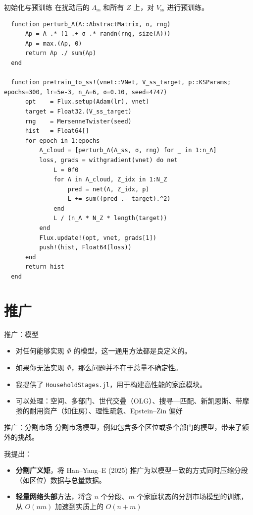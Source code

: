 \documentclass[10pt,aspectratio=169]{beamer}
\begin{document}
\begin{frame}[fragile]{初始化与预训练}
  在扰动后的 $\Lambda_{\mathrm{ss}}$ 和所有 $Z$ 上，对 $V_{\mathrm{ss}}$ 进行预训练。
  \begin{lstlisting}
  function perturb_Λ(Λ::AbstractMatrix, σ, rng)
      Λp = Λ .* (1 .+ σ .* randn(rng, size(Λ)))
      Λp = max.(Λp, 0)
      return Λp ./ sum(Λp)
  end

  function pretrain_to_ss!(vnet::VNet, V_ss_target, p::KSParams; epochs=300, lr=5e-3, n_Λ=6, σ=0.10, seed=4747)
      opt    = Flux.setup(Adam(lr), vnet)
      target = Float32.(V_ss_target)
      rng    = MersenneTwister(seed)
      hist   = Float64[]
      for epoch in 1:epochs
          Λ_cloud = [perturb_Λ(Λ_ss, σ, rng) for _ in 1:n_Λ]
          loss, grads = withgradient(vnet) do net
              L = 0f0
              for Λ in Λ_cloud, Z_idx in 1:N_Z
                  pred = net(Λ, Z_idx, p)
                  L += sum((pred .- target).^2)
              end
              L / (n_Λ * N_Z * length(target))
          end
          Flux.update!(opt, vnet, grads[1])
          push!(hist, Float64(loss))
      end
      return hist
  end
  \end{lstlisting}
\end{frame}

\section[推广]{推广}

\begin{frame}{推广：模型}
  \begin{itemize}
    \item 对任何能够实现 $\Phi$ 的模型，这一通用方法都是良定义的。
    \item 如果你无法实现 $\Phi$，那么问题并不在于总量不确定性。
    \item 我提供了 \texttt{HouseholdStages.jl}，用于构建高性能的家庭模块。
    \item 可以处理：空间、多部门、世代交叠（OLG）、搜寻—匹配、新凯恩斯、带摩擦的耐用资产（如住房）、理性疏忽、Epstein--Zin 偏好
  \end{itemize}
\end{frame}

\begin{frame}{推广：分割市场}
  分割市场模型，例如包含多个区位或多个部门的模型，带来了额外的挑战。

  我提出：
  \begin{itemize}
    \item \textbf{分割广义矩}，将 Han--Yang--E (2025) 推广为以模型一致的方式同时压缩分段（如区位）数据与总量数据。
    \item \textbf{轻量网络头部}方法，将含 $n$ 个分段、$m$ 个家庭状态的分割市场模型的训练，从 $O(nm)$ 加速到实质上的 $O(n+m)$
  \end{itemize}
\end{frame}
\end{document}
